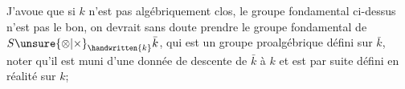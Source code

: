 J'avoue que si $k$ n'est pas algébriquement clos, le groupe fondamental ci-dessus n'est   pas le bon, on devrait sans doute prendre le groupe fondamental de $S\unsure{\otimes|\times}_{\handwritten{k}}\bar{k}$, qui est un groupe proalgébrique défini sur $\bar{k}$, noter qu'il est muni d'une donnée de descente de $\bar{k}$ à $k$ et est par suite défini en réalité sur $k$; 
